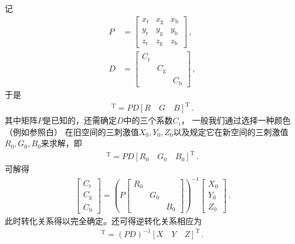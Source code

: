记
\begin{align}
      P & =\left[\begin{array}{ccc}
                  x_\mathrm{r} & x_\mathrm{g} & x_\mathrm{b} \\
                  y_\mathrm{r} & y_\mathrm{g} & y_\mathrm{b} \\
                  z_\mathrm{r} & z_\mathrm{g} & z_\mathrm{b}
            \end{array}\right]\, , \\
      D & =\left[\begin{array}{ccc}
                  C_\mathrm{r} &              &              \\
                               & C_\mathrm{g} &              \\
                               &              & C_\mathrm{b}
            \end{array}\right]\, ,
\end{align}
于是
\begin{align}
      [X\quad Y\quad Z]^{\mathrm{T}}=PD[R\quad G\quad B]^{\mathrm{T}}\, .
\end{align}
其中矩阵$P$是已知的，还需确定$D$中的三个系数$C_i$，
一般我们通过选择一种颜色（例如参照白）
在旧空间的三刺激值$X_0,Y_0,Z_0$以及规定它在新空间的三刺激值$R_0,G_0,B_0$来求解，即
\begin{align}
      [X_0\quad Y_0\quad Z_0]^{\mathrm{T}}=PD[R_0\quad G_0\quad B_0]^{\mathrm{T}}\, .
\end{align}
可解得
\begin{align}
      \left[\begin{array}{c}
                  C_\mathrm{r} \\C_\mathrm{g}\\C_\mathrm{b}
            \end{array}\right]=\left(P
      \left[\begin{array}{ccc}
                  R_0 &     &     \\
                      & G_0 &     \\
                      &     & B_0
            \end{array}\right]\right)^{-1}
      \left[\begin{array}{c}
                  X_0 \\Y_0\\Z_0
            \end{array}\right]\, .
\end{align}
此时转化关系得以完全确定。还可得逆转化关系相应为
\begin{align}
      [R\quad G\quad B]^{\mathrm{T}}=(PD)^{-1}[X\quad Y\quad Z]^{\mathrm{T}}\, .
\end{align}

